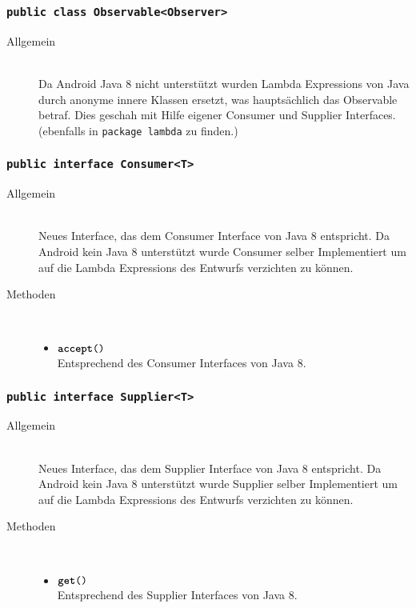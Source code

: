 \subsubsection{\normalfont \texttt{public class \textbf{Observable}<Observer>}}

\begin{description}
\item[Allgemein] \hfill \\ Da Android Java 8 nicht unterstützt wurden Lambda Expressions von Java durch anonyme innere Klassen ersetzt, was hauptsächlich das Observable betraf. Dies geschah mit Hilfe eigener Consumer und Supplier Interfaces. (ebenfalls in \texttt{package lambda} zu finden.)
\end{description}

\subsubsection{\normalfont \texttt{public interface \textbf{Consumer}<T>}}

\begin{description}
\item[Allgemein] \hfill \\ Neues Interface, das dem Consumer Interface von Java 8 entspricht. Da Android kein Java 8 unterstützt wurde Consumer selber Implementiert um auf die Lambda Expressions des Entwurfs verzichten zu können.

\item[Methoden] \hfill \\
	\vspace{-.8cm}
	\begin{itemize}
		\item $\texttt{\textbf{accept}()}$ \\ Entsprechend des Consumer Interfaces von Java 8.
	\end{itemize}
\end{description}

\subsubsection{\normalfont \texttt{public interface \textbf{Supplier}<T>}}

\begin{description}
\item[Allgemein] \hfill \\ Neues Interface, das dem Supplier Interface von Java 8 entspricht. Da Android kein Java 8 unterstützt wurde Supplier selber Implementiert um auf die Lambda Expressions des Entwurfs verzichten zu können.

\item[Methoden] \hfill \\
	\vspace{-.8cm}
	\begin{itemize}
		\item $\texttt{\textbf{get}()}$ \\ Entsprechend des Supplier Interfaces von Java 8.
	\end{itemize}
\end{description}